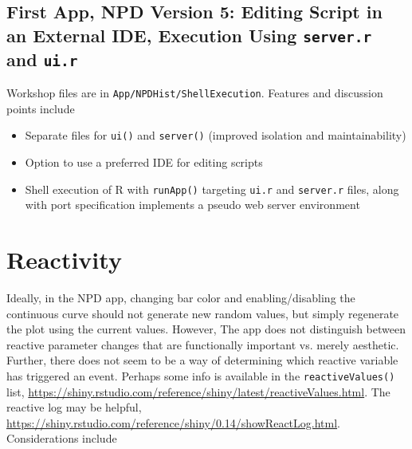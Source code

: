 \documentclass[10pt, letterpaper]{article}
\begin{document}
\begin{spacing}{1.0}

\subsection{First App, NPD Version 5:  Editing Script in an External IDE, Execution Using \texttt{server.r} and \texttt{ui.r}}\label{sec:NPD-5}

Workshop files are in \texttt{App/NPDHist/ShellExecution}.  Features and discussion points include

\begin{itemize}
    \item Separate files for \texttt{ui()} and \texttt{server()} (improved isolation and maintainability)
    \item Option to use a preferred IDE for editing scripts
    \item Shell execution of R with \texttt{runApp()} targeting \texttt{ui.r} and \texttt{server.r} files, along with port specification implements a pseudo web server environment
\end{itemize}

\clearpage


\section{Reactivity}\label{sec:reactivity}

Ideally, in the NPD app, changing bar color and enabling/disabling the continuous curve should not generate new random values, but simply regenerate the plot using the current values.  However, The app does not distinguish between reactive parameter changes that are functionally important vs. merely aesthetic.  Further, there does not seem to be a way of determining which reactive variable has triggered an event.  Perhaps some info is available in the \texttt{reactiveValues()} list, \url{https://shiny.rstudio.com/reference/shiny/latest/reactiveValues.html}.  The reactive log may be helpful, \url{https://shiny.rstudio.com/reference/shiny/0.14/showReactLog.html}.  Considerations include


\end{spacing}
\end{document}
